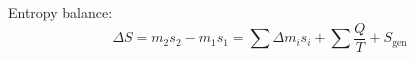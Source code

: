 Entropy balance:  
\[
\Delta S = m_2 s_2 - m_1 s_1 = \sum \Delta m_i s_i + \sum \frac{Q}{T} + S_{\text{gen}}
\]
